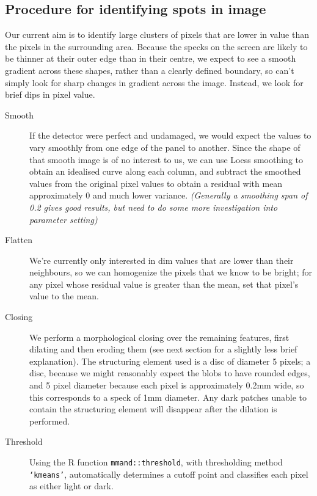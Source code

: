 \documentclass[10pt,fleqn]{article}
\begin{document}
\subsection*{Procedure for identifying spots in image}
Our current aim is to identify large clusters of pixels that are lower in value than the pixels in the surrounding area. Because the specks on the screen are likely to be thinner at their outer edge than in their centre, we expect to see a smooth gradient across these shapes, rather than a clearly defined boundary, so can't simply look for sharp changes in gradient across the image. Instead, we look for brief dips in pixel value.

\begin{description}

\item[Smooth] If the detector were perfect and undamaged, we would expect the values to vary smoothly from one edge of the panel to another. Since the shape of that smooth image is of no interest to us, we can use Loess smoothing to obtain an idealised curve along each column, and subtract the smoothed values from the original pixel values to obtain a residual with mean approximately 0 and much lower variance. \textit{(Generally a smoothing span of 0.2 gives good results, but need to do some more investigation into parameter setting)}

\item[Flatten] We're currently only interested in dim values that are lower than their neighbours, so we can homogenize the pixels that we know to be bright; for any pixel whose residual value is greater than the mean, set that pixel's value to the mean.

\item[Closing] We perform a morphological closing over the remaining features, first dilating and then eroding them (see next section for a slightly less brief explanation). The structuring element used is a disc of diameter 5 pixels; a disc, because we might reasonably expect the blobs to have rounded edges, and 5 pixel diameter because each pixel is approximately 0.2mm wide, so this corresponds to a speck of 1mm diameter. Any dark patches unable to contain the structuring element will disappear after the dilation is performed. 

\item[Threshold] Using the R function \texttt{mmand::threshold}, with thresholding method \texttt{`kmeans'}, automatically determines a cutoff point and classifies each pixel as either light or dark.

\end{description}
\end{document}
